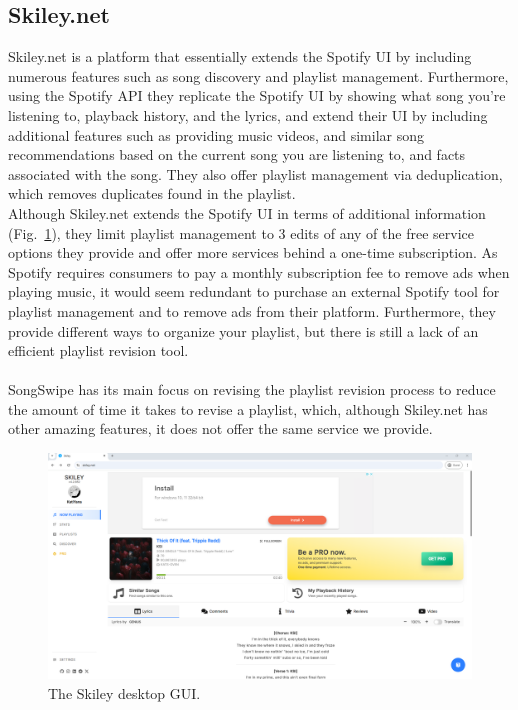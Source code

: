 \documentclass{article}
\begin{document}
\pagebreak

\subsection{Skiley.net}
\quad Skiley.net is a platform that essentially extends the Spotify UI by including numerous features such as song discovery and playlist management. Furthermore, using the Spotify API they replicate the Spotify UI by showing what song you’re listening to, playback history, and the lyrics,  and extend their UI by including additional features such as providing music videos, and similar song recommendations based on the current song you are listening to, and facts associated with the song. They also offer playlist management via deduplication, which removes duplicates found in the playlist. \cite{skiley} \\

Although Skiley.net extends the Spotify UI in terms of additional information (Fig.~\ref{fig:skiley}), they limit playlist management to 3 edits of any of the free service options they provide and offer more services behind a one-time subscription. As Spotify requires consumers to pay a monthly subscription fee to remove ads when playing music, it would seem redundant to purchase an external Spotify tool for playlist management and to remove ads from their platform. Furthermore, they provide different ways to organize your playlist, but there is still a lack of an efficient playlist revision tool. \\
\\
\quad SongSwipe has its main focus on revising the playlist revision process to reduce the amount of time it takes to revise a playlist, which, although Skiley.net has other amazing features, it does not offer the same service we provide.

\begin{figure}[ht]
  \centering
  \includegraphics[width=\textwidth]{./skileyss.png}
  \caption{The Skiley desktop GUI.}
  \label{fig:skiley}
\end{figure}
\end{document}
